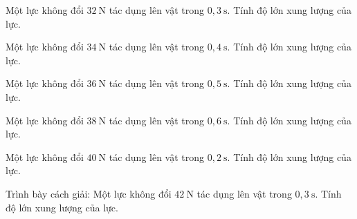 \begin{ex}
Một lực không đổi $32\ \mathrm{N}$ tác dụng lên vật trong $0,3\ \mathrm{s}$. Tính độ lớn xung lượng của lực.
\end{ex}

\begin{ex}
Một lực không đổi $34\ \mathrm{N}$ tác dụng lên vật trong $0,4\ \mathrm{s}$. Tính độ lớn xung lượng của lực.
\end{ex}

\begin{ex}
Một lực không đổi $36\ \mathrm{N}$ tác dụng lên vật trong $0,5\ \mathrm{s}$. Tính độ lớn xung lượng của lực.
\end{ex}

\begin{ex}
Một lực không đổi $38\ \mathrm{N}$ tác dụng lên vật trong $0,6\ \mathrm{s}$. Tính độ lớn xung lượng của lực.
\end{ex}

\begin{ex}
Một lực không đổi $40\ \mathrm{N}$ tác dụng lên vật trong $0,2\ \mathrm{s}$. Tính độ lớn xung lượng của lực.
\end{ex}

\begin{bt}
Trình bày cách giải: Một lực không đổi $42\ \mathrm{N}$ tác dụng lên vật trong $0,3\ \mathrm{s}$. Tính độ lớn xung lượng của lực.
\end{bt}

